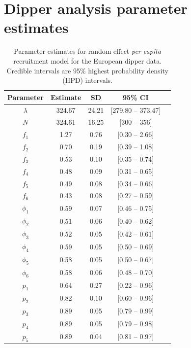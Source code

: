 \documentclass[11pt]{article}
\begin{document}
\clearpage

\section{Dipper analysis parameter estimates}
\renewcommand{\baselinestretch}{1.15}\normalsize

\begin{table}[h]
    \caption{Parameter estimates for random effect {\it per capita} recruitment model for the European dipper data. Credible intervals are 95\% highest probability density (HPD) intervals.} \bigskip
    \label{tab:dipper}
    \centering
    \begin{tabular}{ccccc}
        \hline\hline
        Parameter & Estimate &  SD & 95\% CI \\
        \hline
        $\lambda$ & 324.67 & 24.21 & [279.80 -- 373.47]  \\
        $N$ & 324.61 & 16.25 & [300 -- 356]  \\
        \hline
        $f_1$ & 1.27 & 0.76 & [0.30 -- 2.66]  \\
         $f_2$ & 0.70  & 0.19 &  [0.39 -- 1.08]  \\
         $f_3$ & 0.53  & 0.10 &  [0.35 -- 0.74]  \\
         $f_4$ & 0.48  & 0.09 &  [0.31 -- 0.65]  \\
         $f_5$ & 0.49  & 0.08 &  [0.34 -- 0.66]  \\
         $f_6$ & 0.43  & 0.08 &  [0.27 -- 0.59]  \\
         \hline
         $\phi_1$ & 0.59 & 0.07 &  [0.46 -- 0.75]  \\
         $\phi_2$ & 0.51 & 0.06 &  [0.40 -- 0.62]  \\
         $\phi_3$ & 0.52 & 0.05 &  [0.42 -- 0.61]  \\
         $\phi_4$ & 0.59 & 0.05 &  [0.50 -- 0.69]  \\
         $\phi_5$ & 0.58 & 0.05 &  [0.50 -- 0.67]  \\
         $\phi_6$ &  0.58 & 0.06 &  [0.48 -- 0.70]  \\
         \hline
         $p_1$ & 0.64 & 0.27 &  [0.22 -- 0.96]  \\
         $p_2$ & 0.82 & 0.10 &  [0.60 -- 0.96]  \\
         $p_3$ & 0.89 & 0.05 &  [0.79 -- 0.99]  \\
         $p_4$ & 0.89 & 0.05 &  [0.79 -- 0.98]  \\
         $p_5$ & 0.89 & 0.04 &  [0.81 -- 0.97]  \\

\end{tabular}
\end{table}
\end{document}
